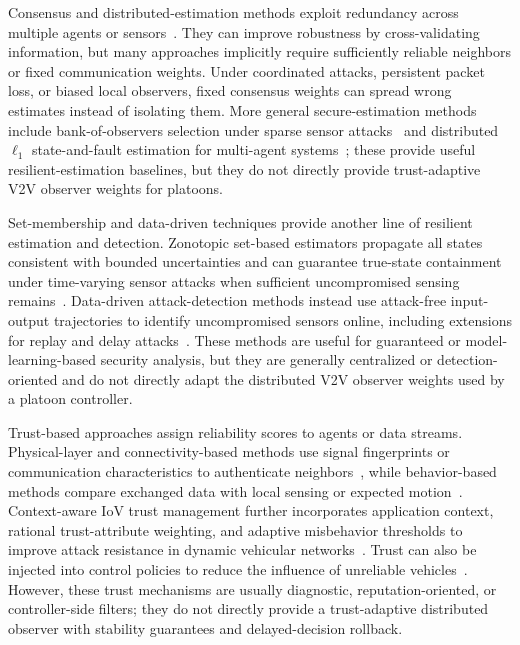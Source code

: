 \documentclass[journal,twoside]{IEEEtran}
\begin{document}
Consensus and distributed-estimation methods exploit redundancy across multiple agents or sensors~\cite{Guitao_multi_mesure,Consensus_discret_Saber,Plug_play}. They can improve robustness by cross-validating information, but many approaches implicitly require sufficiently reliable neighbors or fixed communication weights. Under coordinated attacks, persistent packet loss, or biased local observers, fixed consensus weights can spread wrong estimates instead of isolating them. More general secure-estimation methods include bank-of-observers selection under sparse sensor attacks~\cite{chong2021secure} and distributed $\ell_1$ state-and-fault estimation for multi-agent systems~\cite{hashimoto2020distributed_l1}; these provide useful resilient-estimation baselines, but they do not directly provide trust-adaptive V2V observer weights for platoons.

Set-membership and data-driven techniques provide another line of resilient estimation and detection. Zonotopic set-based estimators propagate all states consistent with bounded uncertainties and can guarantee true-state containment under time-varying sensor attacks when sufficient uncompromised sensing remains~\cite{niazi2023resilient_set}. Data-driven attack-detection methods instead use attack-free input-output trajectories to identify uncompromised sensors online, including extensions for replay and delay attacks~\cite{coimbatore2025data_driven_attack}. These methods are useful for guaranteed or model-learning-based security analysis, but they are generally centralized or detection-oriented and do not directly adapt the distributed V2V observer weights used by a platoon controller.

Trust-based approaches assign reliability scores to agents or data streams. Physical-layer and connectivity-based methods use signal fingerprints or communication characteristics to authenticate neighbors~\cite{trust_physic_connecte,KF_chisquare_meusure}, while behavior-based methods compare exchanged data with local sensing or expected motion~\cite{trust_simple,trust_complex}. Context-aware IoV trust management further incorporates application context, rational trust-attribute weighting, and adaptive misbehavior thresholds to improve attack resistance in dynamic vehicular networks~\cite{siddiqui2023trust_vehicles}. Trust can also be injected into control policies to reduce the influence of unreliable vehicles~\cite{self-belive,Enhancing_control_trust}. However, these trust mechanisms are usually diagnostic, reputation-oriented, or controller-side filters; they do not directly provide a trust-adaptive distributed observer with stability guarantees and delayed-decision rollback.
\end{document}
